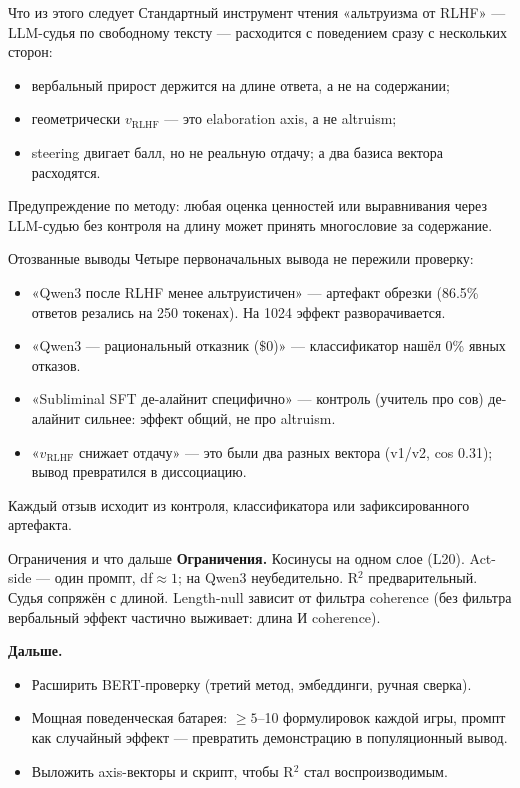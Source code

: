 \documentclass[aspectratio=169,11pt]{beamer}
\begin{document}
\begin{frame}{Что из этого следует}
Стандартный инструмент чтения «альтруизма от RLHF» — LLM-судья по свободному тексту — расходится с поведением сразу с нескольких сторон:
\begin{itemize}
  \item вербальный прирост держится на длине ответа, а не на содержании;
  \item геометрически $v_\text{RLHF}$ — это elaboration axis, а не altruism;
  \item steering двигает балл, но не реальную отдачу; а два базиса вектора расходятся.
\end{itemize}
\vspace{0.3em}
Предупреждение по методу: любая оценка ценностей или выравнивания через LLM-судью без контроля на длину может принять многословие за содержание.
\end{frame}

\begin{frame}{Отозванные выводы}
Четыре первоначальных вывода не пережили проверку:
\begin{itemize}
  \item «Qwen3 после RLHF менее альтруистичен» — артефакт обрезки (86.5\% ответов резались на 250 токенах). На 1024 эффект разворачивается.
  \item «Qwen3 — рациональный отказник ($\$0$)» — классификатор нашёл 0\% явных отказов.
  \item «Subliminal SFT де-алайнит специфично» — контроль (учитель про сов) де-алайнит сильнее: эффект общий, не про altruism.
  \item «$v_\text{RLHF}$ снижает отдачу» — это были два разных вектора (v1/v2, cos 0.31); вывод превратился в диссоциацию.
\end{itemize}
Каждый отзыв исходит из контроля, классификатора или зафиксированного артефакта.
\end{frame}

\begin{frame}{Ограничения и что дальше}
\textbf{Ограничения.} Косинусы на одном слое (L20). Act-side — один промпт, df$\approx 1$; на Qwen3 неубедительно. R$^2$ предварительный. Судья сопряжён с длиной. Length-null зависит от фильтра coherence (без фильтра вербальный эффект частично выживает: длина И coherence).
\vspace{0.4em}

\textbf{Дальше.}
\begin{itemize}
  \item Расширить BERT-проверку (третий метод, эмбеддинги, ручная сверка).
  \item Мощная поведенческая батарея: $\geq 5$–10 формулировок каждой игры, промпт как случайный эффект — превратить демонстрацию в популяционный вывод.
  \item Выложить axis-векторы и скрипт, чтобы R$^2$ стал воспроизводимым.
\end{itemize}
\end{frame}
\end{document}
